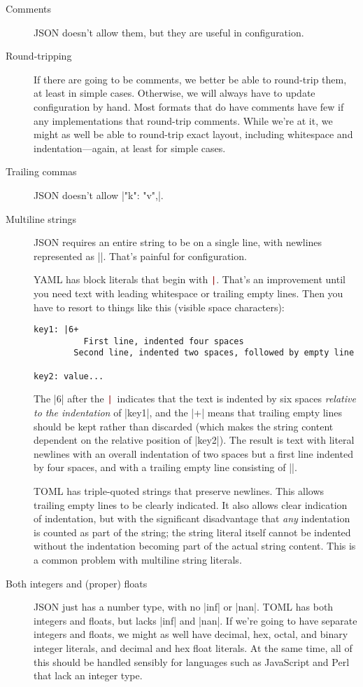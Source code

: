 \documentclass[11pt]{article}
\newcommand{\verbpipe}{\textcolor{DarkRed}{\texttt{\string|}}}
\begin{document}
\begin{description}
\item[Comments]  JSON doesn't allow them, but they are useful in configuration.

\item[Round-tripping]  If there are going to be comments, we better be able to round-trip them, at least in simple cases.  Otherwise, we will always have to update configuration by hand.  Most formats that do have comments have few if any implementations that round-trip comments.  While we're at it, we might as well be able to round-trip exact layout, including whitespace and indentation---again, at least for simple cases.

\item[Trailing commas]  JSON doesn't allow |{"k": "v",}|.

\item[Multiline strings]  JSON requires an entire string to be on a single line, with newlines represented as |\n|.  That's painful for configuration.

YAML has block literals that begin with \verbpipe.  That's an improvement until you need text with leading whitespace or trailing empty lines.  Then you have to resort to things like this (visible space characters):
\begin{Verbatim}[showspaces]
key1: |6+
          First line, indented four spaces
        Second line, indented two spaces, followed by empty line

key2: value...
\end{Verbatim}
The |6| after the \verbpipe\ indicates that the text is indented by six spaces \emph{relative to the indentation} of |key1|, and the |+| means that trailing empty lines should be kept rather than discarded (which makes the string content dependent on the relative position of |key2|).  The result is text with literal newlines with an overall indentation of two spaces but a first line indented by four spaces, and with a trailing empty line consisting of |\n|.

TOML has triple-quoted strings that preserve newlines.  This allows trailing empty lines to be clearly indicated.  It also allows clear indication of indentation, but with the significant disadvantage that \emph{any} indentation is counted as part of the string; the string literal itself cannot be indented without the indentation becoming part of the actual string content.  This is a common problem with multiline string literals.

\item[Both integers and (proper) floats]  JSON just has a number type, with no |inf| or |nan|.  TOML has both integers and floats, but lacks |inf| and |nan|.  If we're going to have separate integers and floats, we might as well have decimal, hex, octal, and binary integer literals, and decimal and hex float literals.  At the same time, all of this should be handled sensibly for languages such as JavaScript and Perl that lack an integer type.


\end{description}
\end{document}
